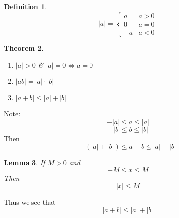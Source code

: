 \documentclass{article}
\newtheorem{theorem}{Theorem}[section]
\newtheorem{lemma}[theorem]{Lemma}
\newtheorem{definition}[theorem]{Definition}
\newtheorem{one minute paper}[theorem]{One Minute Paper}
\begin{document}
\begin{definition}
    \begin{equation}
        |a| = \begin{cases}
            a & a > 0 \\
            0 & a = 0 \\
            -a & a < 0
        \end{cases}
    \end{equation}
\end{definition}

\begin{theorem}
    \begin{enumerate}
        \item $|a| > 0$ \& $|a| = 0 \iff a = 0$
        \item $|ab| = |a| \cdot |b|$
        \item $|a + b| \leq |a| + |b|$
    \end{enumerate}
\end{theorem}

Note:
\begin{equation}
    -|a| \leq a \leq |a|
\end{equation}
\begin{equation}
    -|b| \leq b \leq |b|
\end{equation}
Then 
\begin{equation}
    -(|a| + |b|) \leq a + b \leq |a| + |b|
\end{equation}
\begin{lemma}
    If $M > 0$ and 
    \begin{equation}
        -M \leq x \leq M
    \end{equation}
    Then
    \begin{equation}
        |x| \leq M
    \end{equation}
\end{lemma}
Thus we see that 
\begin{equation}
    |a + b| \leq |a| + |b|
\end{equation}
\end{document}

